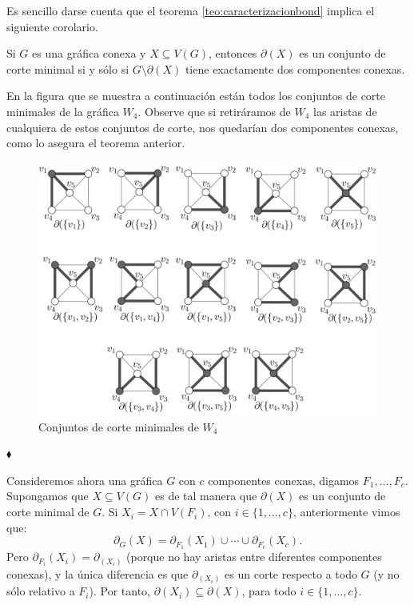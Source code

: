 Es sencillo darse cuenta que el teorema \ref{teo:caracterizacionbond} implica el siguiente corolario.

\begin{cor}\label{cor:corteminimalcomponentesconexas}
 Si $G$ es una gráfica conexa y $X\subseteq V(G)$, entonces $\partial(X)$ es un conjunto de corte minimal si y sólo si $G\setminus \partial(X)$ tiene exactamente dos componentes conexas. 
\end{cor}


\begin{ejem}
En la figura que se muestra a continuación están todos los conjuntos de corte minimales de la gráfica $W_{4}$. Observe que si retiráramos de $W_{4}$ las aristas de cualquiera de estos conjuntos de corte, nos quedarían dos componentes conexas, como lo asegura el teorema anterior.

\begin{figure}[H]
    \centering
    \includegraphics[scale=0.7]{img/imgchapter2/bond.jpg}
    \caption{Conjuntos de corte minimales de $W_{4}$}
    \label{fig:bondw4}
\end{figure}

\hfill $\blacklozenge$
\end{ejem}

Consideremos ahora una gráfica $G$ con $c$ componentes conexas, digamos $F_{1}, \ldots, F_{c}$. Supongamos que $X \subseteq V(G)$ es de tal manera que $\partial(X)$ es un conjunto de corte minimal de $G$. Si $X_{i} = X\cap V(F_{i})$, con $i \in \{1,\ldots,c \}$, anteriormente vimos que:
$$
    \partial_{G}(X) = \partial_{F_{1}}(X_{1}) \cup \cdots \cup \partial_{F_{c}}(X_{c}).
$$ 
Pero $\partial_{F_{i}}(X_{i}) = \partial_(X_{i})$ (porque no hay aristas entre diferentes componentes conexas), y la única diferencia es que $\partial_(X_{i})$ es un corte respecto a todo $G$ (y no sólo relativo a $F_{i}$). Por tanto, $\partial(X_{i}) \subseteq \partial(X)$, para todo $i\in \{1,\ldots, c\}$. 


